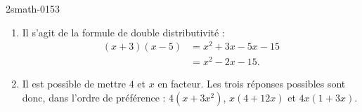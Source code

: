
\begin{corrige}{2smath-0153}

    \begin{enumerate}
        \item
            Il s'agit de la formule de double distributivité :
            \begin{subequations}
                \begin{align}
                    (x+3)(x-5)&=x^2+3x-5x-15\\
                    &=x^2-2x-15.
                \end{align}
            \end{subequations}
        \item
            Il est possible de mettre \( 4\) et \( x\) en facteur. Les trois réponses possibles sont donc, dans l'ordre de préférence : \( 4(x+3x^2)\), \( x(4+12x)\) et \( 4x(1+3x)\).
    \end{enumerate}

\end{corrige}
